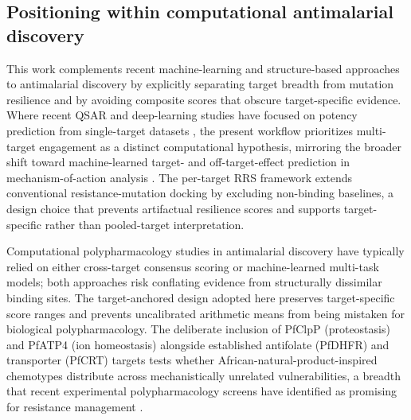 \documentclass[journal=jcisd8,manuscript=article]{achemso}
\begin{document}
\subsection{Positioning within computational antimalarial discovery}
This work complements recent machine-learning and structure-based approaches to antimalarial discovery by explicitly separating target breadth from mutation resilience and by avoiding composite scores that obscure target-specific evidence. Where recent QSAR and deep-learning studies have focused on potency prediction from single-target datasets \cite{Wells2015,SiqueiraNeto2023,Sentinel2025Offtarget}, the present workflow prioritizes multi-target engagement as a distinct computational hypothesis, mirroring the broader shift toward machine-learned target- and off-target-effect prediction in mechanism-of-action analysis \cite{Trapotsi2022MoA}. The per-target RRS framework extends conventional resistance-mutation docking by excluding non-binding baselines, a design choice that prevents artifactual resilience scores and supports target-specific rather than pooled-target interpretation.

Computational polypharmacology studies in antimalarial discovery have typically relied on either cross-target consensus scoring or machine-learned multi-task models; both approaches risk conflating evidence from structurally dissimilar binding sites. The target-anchored design adopted here preserves target-specific score ranges and prevents uncalibrated arithmetic means from being mistaken for biological polypharmacology. The deliberate inclusion of PfClpP (proteostasis) and PfATP4 (ion homeostasis) alongside established antifolate (PfDHFR) and transporter (PfCRT) targets tests whether African-natural-product-inspired chemotypes distribute across mechanistically unrelated vulnerabilities, a breadth that recent experimental polypharmacology screens have identified as promising for resistance management \cite{Wells2015,SiqueiraNeto2023,Blake2025Resistome}.
\end{document}
